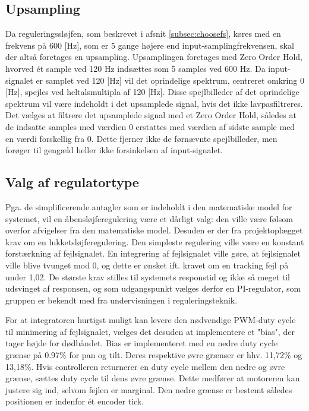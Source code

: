 \subsection{Upsampling}
Da reguleringssløjfen, som beskrevet i afsnit \ref{subsec:choosefs}, køres med en frekvens på 600 [Hz],
som er 5 gange højere end input-samplingfrekvensen, skal der altså foretages en upsampling.
Upsamplingen foretages med Zero Order Hold, hvorved ét sample ved 120 Hz indsættes 
som 5 samples ved 600 Hz.
Da input-signalet er samplet ved 120 [Hz] vil det oprindelige spektrum, centreret omkring 0 [Hz],
spejles ved heltalsmultipla af 120 [Hz]. Disse spejlbilleder af det oprindelige spektrum vil være
indeholdt i det upsamplede signal, hvis det ikke lavpasfiltreres. 
Det vælges at filtrere det upsamplede signal med et Zero Order Hold,
således at de indsatte samples med værdien 0 erstattes med værdien af sidste sample
med en værdi forskellig fra 0. Dette fjerner ikke de førnævnte spejlbilleder, men forøger
til gengæld heller ikke forsinkelsen af input-signalet.

\subsection{Valg af regulatortype}
Pga. de simplificerende antagler som er indeholdt i den matematiske model for systemet,
vil en åbensløjferegulering være et dårligt valg: den ville være følsom overfor afvigelser fra den
matematiske model. Desuden er der fra projektoplægget krav om en lukketsløjferegulering.
Den simpleste regulering ville være en konstant forstærkning af fejlsignalet.
En integrering af fejlsignalet ville gøre, at fejlsignalet ville blive tvunget mod 0,
og dette er ønsket ift. kravet om en tracking fejl på under 1,02\degree.
De største krav stilles til systemets responstid og ikke så meget til udsvinget af responsen,
og som udgangspunkt vælges derfor en PI-regulator, som gruppen er bekendt med fra
undervisningen i reguleringsteknik.

For at integratoren hurtigst muligt kan levere den nødvendige PWM-duty cycle til minimering af fejlsignalet,
vælges det desuden at implementere et "bias", der tager højde for dødbåndet.
Bias er implementeret med en nedre duty cycle grænse på 0.97\% for pan og tilt. Deres respektive øvre grænser er hhv. 11,72\% og 13,18\%. Hvis controlleren returnerer en duty cycle mellem den nedre og øvre grænse, sættes duty cycle til dens øvre grænse. Dette medfører at motoreren kan justere sig ind, selvom fejlen er marginal. Den nedre grænse er bestemt således positionen er indenfor ét encoder tick.
